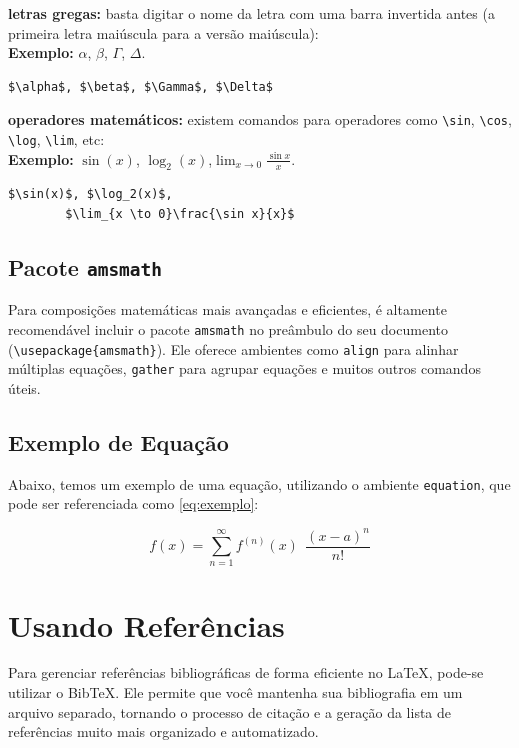 \begin{alineas}
	\item \textbf{letras gregas:} basta digitar o nome da letra com uma barra invertida antes (a primeira letra maiúscula para a versão maiúscula):\\
	\textbf{Exemplo:} $\alpha$, $\beta$, $\Gamma$, $\Delta$.
	\begin{lstlisting}[language={[LaTeX]TeX}]
	$\alpha$, $\beta$, $\Gamma$, $\Delta$
	\end{lstlisting}
	
	\item \textbf{operadores matemáticos:} existem comandos para operadores como \verb|\sin|, \verb|\cos|, \verb|\log|, \verb|\lim|, etc:\\
	\textbf{Exemplo:} $\sin(x)$, $\log_2(x)$,$\lim_{x \to 0}\frac{\sin x}{x}$.
	\begin{lstlisting}[language={[LaTeX]TeX}]
	$\sin(x)$, $\log_2(x)$, 
		$\lim_{x \to 0}\frac{\sin x}{x}$
	\end{lstlisting}
	
\end{alineas}

\subsection{Pacote \texttt{amsmath}}

Para composições matemáticas mais avançadas e eficientes, é altamente recomendável incluir o pacote \texttt{amsmath} no preâmbulo do seu documento (\verb|\usepackage{amsmath}|). Ele oferece ambientes como \texttt{align} para alinhar múltiplas equações, \texttt{gather} para agrupar equações e muitos outros comandos úteis.

\subsection{Exemplo de Equação}
Abaixo, temos um exemplo de uma equação, utilizando o ambiente \texttt{equation}, que pode ser referenciada como \autoref{eq:exemplo}:


\begin{equation}
	\label{eq:exemplo}
	f(x) = \sum_{n=1}^{\infty} f^{(n)}(x)~~\frac{(x-a)^n}{n!}
\end{equation}


\section{Usando Referências}\label{sec:Refs}

Para gerenciar referências bibliográficas de forma eficiente no \LaTeX, pode-se utilizar o BibTeX. Ele permite que você mantenha sua bibliografia em um arquivo separado, tornando o processo de citação e a geração da lista de referências muito mais organizado e automatizado.


